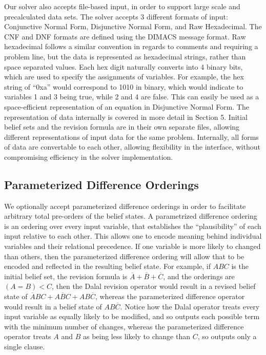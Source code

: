 \documentclass[english]{article}
\begin{document}
Our solver also accepts file-based input, in order to support large
scale and precalculated data sets. The solver accepts 3 different
formats of input: Conjunctive Normal Form, Disjunctive Normal Form,
and Raw Hexadecimal. The CNF and DNF formats are defined using the
DIMACS message format. Raw hexadecimal follows a similar convention
in regards to comments and requiring a problem line, but the data
is represented as hexadecimal strings, rather than space separated
values. Each hex digit naturally converts into 4 binary bits, which
are used to specify the assignments of variables. For example, the
hex string of ``0xa'' would correspond to 1010 in binary, which
would indicate to variables 1 and 3 being true, while 2 and 4 are
false. This can easily be used as a space-efficient representation
of an equation in Disjunctive Normal Form. The representation of data
internally is covered in more detail in Section 5. Initial belief
sets and the revision formula are in their own separate files, allowing
different representations of input data for the same problem. Internally,
all forms of data are convertable to each other, allowing flexibility
in the interface, without compromising efficiency in the solver implementation. 

\subsection{Parameterized Difference Orderings}

We optionally accept parameterized difference orderings in order to
facilitate arbitrary total pre-orders of the belief states. A parametrized
difference ordering is an ordering over every input variable, that
establishes the ``plausibility'' of each input relative to each
other. This allows one to encode meaning behind individual variables
and their relational precedence. If one variable is more likely to
changed than others, then the parameterized difference ordering will
allow that to be encoded and reflected in the resulting belief state.
For example, if $ABC$ is the initial belief set, the revision formula
is $\overline{A}+\overline{B}+\overline{C}$, and the orderings are
$(A=B)<C$, then the Dalal revision operator would result in a revised
belief state of $\overline{A}BC+A\overline{B}C+AB\overline{C}$, whereas
the parameterized difference operator would result in a belief state
of $AB\overline{C}$. Notice how the Dalal operator treats every input
variable as equally likely to be modified, and so outputs each possible
term with the minimum number of changes, whereas the parameterized
difference operator treats $A$ and $B$ as being less likely to change
than $C$, so outputs only a single clause.
\end{document}
